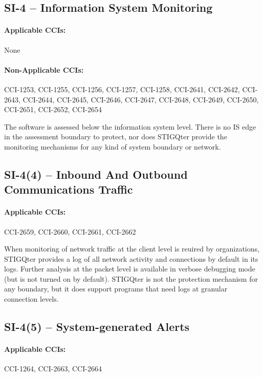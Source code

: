 \documentclass[letterpaper, 10pt, twoside]{article}
\begin{document}
\subsection{SI-4 -- Information System Monitoring}

\paragraph{Applicable CCIs:} None

\paragraph{Non-Applicable CCIs:} CCI-1253, CCI-1255, CCI-1256, CCI-1257, CCI-1258, CCI-2641, CCI-2642, CCI-2643, CCI-2644, CCI-2645, CCI-2646, CCI-2647, CCI-2648, CCI-2649, CCI-2650, CCI-2651, CCI-2652, CCI-2654

The software is assessed below the information system level. There is no IS edge in the assessment boundary to protect, nor does STIGQter provide the monitoring mechanisms for any kind of system boundary or network.

\subsection{SI-4(4) -- Inbound And Outbound Communications Traffic}

\paragraph{Applicable CCIs:} CCI-2659, CCI-2660, CCI-2661, CCI-2662

When monitoring of network traffic at the client level is reuired by organizations, STIGQter provides a log of all network activity and connections by default in its logs. Further analysis at the packet level is available in verbose debugging mode (but is not turned on by default). STIGQter is not the protection mechanism for any boundary, but it does support programs that need logs at granular connection levels.

\subsection{SI-4(5) -- System-generated Alerts}

\paragraph{Applicable CCIs:} CCI-1264, CCI-2663, CCI-2664
\end{document}
